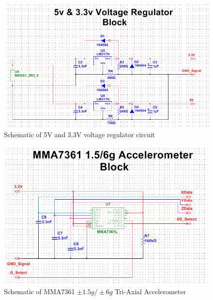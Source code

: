 \begin{figure}[h]
\centering
\includegraphics[width=\textwidth,height=\textheight,keepaspectratio]{./KIRBY_Images/Multisim_VoltageRegulation}
\caption{Schematic of 5V and 3.3V voltage regulator circuit}
\label{fig:Schematic_VoltageReg}
\end{figure}

\begin{figure}[h]
\centering
\includegraphics[width=\textwidth,height=\textheight,keepaspectratio]{./KIRBY_Images/Multisim_MMA7361}
\caption{Schematic of MMA7361 $\pm 1.5g/ \pm 6g$ Tri-Axial Accelerometer}
\label{fig:Schematic_MMA7361}
\end{figure}